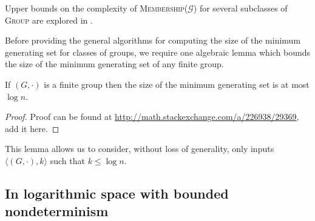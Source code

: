 \documentclass{article}
\begin{document}
Upper bounds on the complexity of \textsc{Membership($\mathcal{G}$)} for several subclasses of \textsc{Group} are explored in \cite{bklm01}.

Before providing the general algorithms for computing the size of the minimum generating set for classes of groups, we require one algebraic lemma which bounds the size of the minimum generating set of any finite group.

\begin{lemma}\label{lem:log}
  If $(G, \cdot)$ is a finite group then the size of the minimum generating set is at most $\log n$.
\end{lemma}
\begin{proof}
  Proof can be found at \url{http://math.stackexchange.com/a/226938/29369}, add it here.
\end{proof}

This lemma allows us to consider, without loss of generality, only inputs $\langle (G, \cdot), k \rangle$ such that $k \leq \log n$.

\subsection{In logarithmic space with bounded nondeterminism}
\end{document}
